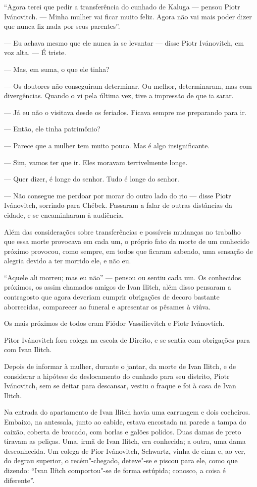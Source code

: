 ``Agora terei que pedir a transferência do cunhado de Kaluga --- pensou
Piotr Ivánovitch. --- Minha mulher vai ficar muito feliz. Agora não vai
mais poder dizer que nunca fiz nada por seus parentes''.

--- Eu achava mesmo que ele nunca ia se levantar --- disse Piotr
Ivánovitch, em voz alta. --- É triste.

--- Mas, em suma, o que ele tinha?

--- Os doutores não conseguiram determinar. Ou melhor, determinaram, mas
com divergências. Quando o vi pela última vez, tive a impressão de que
ia sarar.

--- Já eu não o visitava desde os feriados. Ficava sempre me preparando
para ir.

--- Então, ele tinha patrimônio?

--- Parece que a mulher tem muito pouco. Mas é algo insignificante.

--- Sim, vamos ter que ir. Eles moravam terrivelmente longe.

--- Quer dizer, é longe do senhor. Tudo é longe do senhor.

--- Não consegue me perdoar por morar do outro lado do rio --- disse Piotr
Ivánovitch, sorrindo para Chébek. Passaram a falar de outras distâncias
da cidade, e se encaminharam à audiência.

Além das considerações sobre transferências e possíveis mudanças no
trabalho que essa morte provocava em cada um, o próprio fato da morte de
um conhecido próximo provocou, como sempre, em todos que ficaram
sabendo, uma sensação de alegria devido a ter morrido ele, e não eu.

``Aquele ali morreu; mas eu não'' --- pensou ou sentiu cada um. Os
conhecidos próximos, os assim chamados amigos de Ivan Ilitch, além disso
pensaram a contragosto que agora deveriam cumprir obrigações de decoro
bastante aborrecidas, comparecer ao funeral e apresentar os pêsames à
viúva.

Os mais próximos de todos eram Fiódor Vassílievitch e Piotr Ivánovtich.

Pitor Ivánovitch fora colega na escola de Direito, e se sentia com
obrigações para com Ivan Ilitch.

Depois de informar à mulher, durante o jantar, da morte de Ivan Ilitch,
e de considerar a hipótese do deslocamento do cunhado para seu distrito,
Piotr Ivánovitch, sem se deitar para descansar, vestiu o fraque e foi à
casa de Ivan Ilitch.

Na entrada do apartamento de Ivan Ilitch havia uma carruagem e dois
cocheiros. Embaixo, na antessala, junto ao cabide, estava encostada na
parede a tampa do caixão, coberta de brocado, com borlas e galões
polidos. Duas damas de preto tiravam as peliças. Uma, irmã de Ivan
Ilitch, era conhecida; a outra, uma dama desconhecida. Um colega de Pior
Ivánovitch, Schwartz, vinha de cima e, ao ver, do degrau superior, o
recém"-chegado, deteve"-se e piscou para ele, como que dizendo: ``Ivan
Ilítch comportou"-se de forma estúpida; conosco, a coisa é diferente''.

